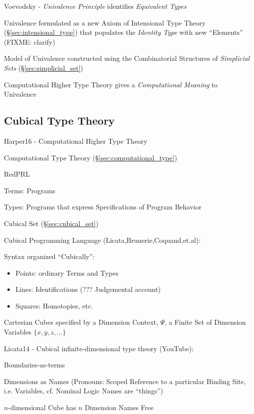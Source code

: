 Voevodsky - \emph{Univalence Principle} identifies \emph{Equivalent Types}

Univalence formulated as a new Axiom of Intensional Type Theory
(\S\ref{sec:intensional_type}) that populates the \emph{Identity Type} with new
``Elements'' (FIXME: clarify)

Model of Univalence constructed using the Combinatorial Structures of
\emph{Simplicial Sets} (\S\ref{sec:simplicial_set})

Computational Higher Type Theory gives a \emph{Computational Meaning} to
Univalence



\subsection{Cubical Type Theory}\label{sec:cubical_type_theory}

Harper16 - Computational Higher Type Theory

\fist Computational Type Theory (\S\ref{sec:computational_type})

RedPRL

Terms: Programs

Types: Programs that express Specifications of Program Behavior

Cubical Set (\S\ref{sec:cubical_set})

Cubical Programming Language (Licata,Brunerie,Coquand,et.al):

Syntax organized ``Cubically'':
\begin{itemize}
  \item Points: ordinary Terms and Types
  \item Lines: Identifications (??? Judgemental account)
  \item Squares: Homotopies, etc.
\end{itemize}

Cartesian Cubes specified by a Dimension Context, $\Psi$, a Finite Set
of Dimension Variables $\{x,y,z,\ldots\}$


Licata14 - Cubical infinite-dimensional type theory (YouTube):

Boundaries-as-terms

Dimensions as Names (Pronouns: Scoped Reference to a particular
Binding Site, i.e. Variables, cf. Nominal Logic Names are ``things'')

$n$-dimensional Cube has $n$ Dimension Names Free



